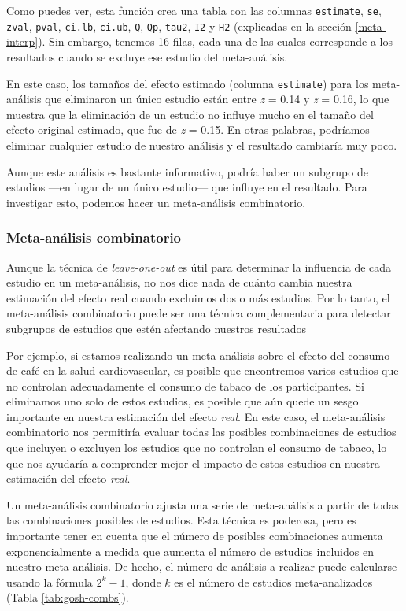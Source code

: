 \documentclass[
  bookmarksnumbered]{article}
\begin{document}
Como puedes ver, esta función crea una tabla con las columnas \texttt{estimate}, \texttt{se}, \texttt{zval}, \texttt{pval}, \texttt{ci.lb}, \texttt{ci.ub}, \texttt{Q}, \texttt{Qp}, \texttt{tau2}, \texttt{I2} y \texttt{H2} (explicadas en la sección \ref{meta-interp}). Sin embargo, tenemos 16 filas, cada una de las cuales corresponde a los resultados cuando se excluye ese estudio del meta-análisis.

En este caso, los tamaños del efecto estimado (columna \texttt{estimate}) para los meta-análisis que eliminaron un único estudio están entre \emph{z} = 0.14 y \emph{z} = 0.16, lo que muestra que la eliminación de un estudio no influye mucho en el tamaño del efecto original estimado, que fue de \emph{z} = 0.15. En otras palabras, podríamos eliminar cualquier estudio de nuestro análisis y el resultado cambiaría muy poco.

Aunque este análisis es bastante informativo, podría haber un subgrupo de estudios ---en lugar de un único estudio--- que influye en el resultado. Para investigar esto, podemos hacer un meta-análisis combinatorio.

\hypertarget{gosh}{%
\subsubsection{Meta-análisis combinatorio}\label{gosh}}

Aunque la técnica de \emph{leave-one-out} es útil para determinar la influencia de cada estudio en un meta-análisis, no nos dice nada de cuánto cambia nuestra estimación del efecto real cuando excluimos dos o más estudios. Por lo tanto, el meta-análisis combinatorio puede ser una técnica complementaria para detectar subgrupos de estudios que estén afectando nuestros resultados

Por ejemplo, si estamos realizando un meta-análisis sobre el efecto del consumo de café en la salud cardiovascular, es posible que encontremos varios estudios que no controlan adecuadamente el consumo de tabaco de los participantes. Si eliminamos uno solo de estos estudios, es posible que aún quede un sesgo importante en nuestra estimación del efecto \emph{real}. En este caso, el meta-análisis combinatorio nos permitiría evaluar todas las posibles combinaciones de estudios que incluyen o excluyen los estudios que no controlan el consumo de tabaco, lo que nos ayudaría a comprender mejor el impacto de estos estudios en nuestra estimación del efecto \emph{real}.

Un meta-análisis combinatorio ajusta una serie de meta-análisis a partir de todas las combinaciones posibles de estudios. Esta técnica es poderosa, pero es importante tener en cuenta que el número de posibles combinaciones aumenta exponencialmente a medida que aumenta el número de estudios incluidos en nuestro meta-análisis. De hecho, el número de análisis a realizar puede calcularse usando la fórmula \(2^k - 1\), donde \(k\) es el número de estudios meta-analizados (Tabla \ref{tab:gosh-combs}).
\end{document}
